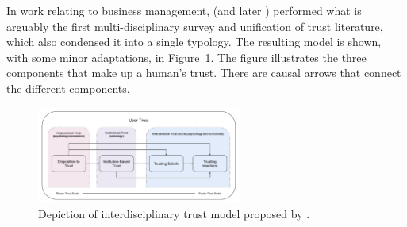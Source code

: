 In work relating to business management, \citet{McKnight1998-ty} (and later \cite{McKnight2001-fa}) performed what is arguably the first multi-disciplinary survey and unification of trust literature, which also condensed it into a single typology. The resulting model is shown, with some minor adaptations, in Figure~\ref{fig:UserTrust}. The figure illustrates the three components that make up a human's trust. There are causal arrows that connect the different components. %

        \begin{figure}[htbp]
            \centering
            \includegraphics[width=0.6\textwidth]{Figures/UserTrust}
            \caption{Depiction of interdisciplinary trust model proposed by \citet{McKnight2001-fa}.} %
            \label{fig:UserTrust}
        \end{figure}

